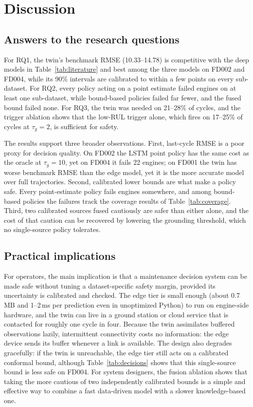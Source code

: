 \documentclass[preprint,12pt,authoryear]{elsarticle}
\begin{document}
\section{Discussion}\label{sec:discussion}

\subsection{Answers to the research questions}
For RQ1, the twin's benchmark RMSE (10.33--14.78) is competitive with the deep models in Table~\ref{tab:literature} and best among the three models on FD002 and FD004, while its 90\% intervals are calibrated to within a few points on every sub-dataset. For RQ2, every policy acting on a point estimate failed engines on at least one sub-dataset, while bound-based policies failed far fewer, and the fused bound failed none. For RQ3, the twin was needed on 21--28\% of cycles, and the trigger ablation shows that the low-RUL trigger alone, which fires on 17--25\% of cycles at $\tau_g = 2$, is sufficient for safety.

The results support three broader observations. First, last-cycle RMSE is a poor proxy for decision quality. On FD002 the LSTM point policy has the same cost as the oracle at $\tau_g = 10$, yet on FD004 it fails 22 engines; on FD001 the twin has worse benchmark RMSE than the edge model, yet it is the more accurate model over full trajectories. Second, calibrated lower bounds are what make a policy safe. Every point-estimate policy fails engines somewhere, and among bound-based policies the failures track the coverage results of Table~\ref{tab:coverage}. Third, two calibrated sources fused cautiously are safer than either alone, and the cost of that caution can be recovered by lowering the grounding threshold, which no single-source policy tolerates.

\subsection{Practical implications}
For operators, the main implication is that a maintenance decision system can be made safe without tuning a dataset-specific safety margin, provided its uncertainty is calibrated and checked. The edge tier is small enough (about 0.7\,MB and 1--2\,ms per prediction even in unoptimized Python) to run on engine-side hardware, and the twin can live in a ground station or cloud service that is contacted for roughly one cycle in four. Because the twin assimilates buffered observations lazily, intermittent connectivity costs no information: the edge device sends its buffer whenever a link is available. The design also degrades gracefully: if the twin is unreachable, the edge tier still acts on a calibrated conformal bound, although Table~\ref{tab:decisions} shows that this single-source bound is less safe on FD004. For system designers, the fusion ablation shows that taking the more cautious of two independently calibrated bounds is a simple and effective way to combine a fast data-driven model with a slower knowledge-based one.
\end{document}
